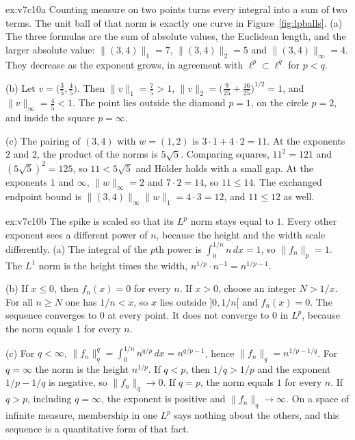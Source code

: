 \begin{solution}{ex:v7c10a}
\idea Counting measure on two points turns every integral into a sum of two terms. The unit ball of that norm is exactly one curve in Figure~\ref{fig:lpballs}.
\writeup (a) The three formulas are the sum of absolute values, the Euclidean length, and the larger absolute value: $\|(3,4)\|_1=7$, $\|(3,4)\|_2=5$ and $\|(3,4)\|_\infty=4$. They decrease as the exponent grows, in agreement with $\ell^p\subset\ell^q$ for $p<q$.

(b) Let $v=\bigl(\frac35,\frac45\bigr)$. Then $\|v\|_1=\frac75>1$, $\|v\|_2=\bigl(\frac{9}{25}+\frac{16}{25}\bigr)^{1/2}=1$, and $\|v\|_\infty=\frac45<1$. The point lies outside the diamond $p=1$, on the circle $p=2$, and inside the square $p=\infty$.

(c) The pairing of $(3,4)$ with $w=(1,2)$ is $3\cdot1+4\cdot2=11$. At the exponents $2$ and $2$, the product of the norms is $5\sqrt5$. Comparing squares, $11^2=121$ and $(5\sqrt5)^2=125$, so $11<5\sqrt5$ and Hölder holds with a small gap. At the exponents $1$ and $\infty$, $\|w\|_\infty=2$ and $7\cdot2=14$, so $11\le14$. The exchanged endpoint bound is $\| (3,4) \|_\infty\|w\|_1=4\cdot3=12$, and $11\le12$ as well.
\end{solution}

\begin{solution}{ex:v7c10b}
\idea The spike is scaled so that its $L^p$ norm stays equal to $1$. Every other exponent sees a different power of $n$, because the height and the width scale differently.
\writeup (a) The integral of the $p$th power is $\int_0^{1/n} n\,dx=1$, so $\|f_n\|_p=1$. The $L^1$ norm is the height times the width, $n^{1/p}\cdot n^{-1}=n^{1/p-1}$.

(b) If $x\le0$, then $f_n(x)=0$ for every $n$. If $x>0$, choose an integer $N>1/x$. For all $n\ge N$ one has $1/n<x$, so $x$ lies outside $]0,1/n[$ and $f_n(x)=0$. The sequence converges to $0$ at every point. It does not converge to $0$ in $L^p$, because the norm equals $1$ for every $n$.

(c) For $q<\infty$, $\|f_n\|_q^q=\int_0^{1/n}n^{q/p}\,dx=n^{q/p-1}$, hence $\|f_n\|_q=n^{1/p-1/q}$. For $q=\infty$ the norm is the height $n^{1/p}$. If $q<p$, then $1/q>1/p$ and the exponent $1/p-1/q$ is negative, so $\|f_n\|_q\to0$. If $q=p$, the norm equals $1$ for every $n$. If $q>p$, including $q=\infty$, the exponent is positive and $\|f_n\|_q\to\infty$. On a space of infinite measure, membership in one $L^p$ says nothing about the others, and this sequence is a quantitative form of that fact.
\end{solution}

